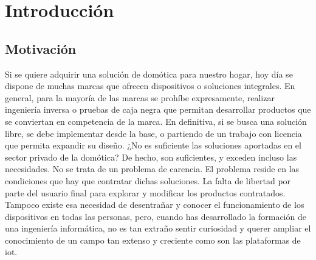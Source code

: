 \cleardoublepage

\chapter{Introducción}

\section{Motivación}
\label{ch:Capitulo1}

Si se quiere adquirir una solución de domótica para nuestro hogar, hoy día se dispone de muchas marcas que ofrecen dispositivos o soluciones integrales. En general, para la mayoría de las marcas se prohíbe expresamente, realizar ingeniería inversa o pruebas de caja negra que permitan desarrollar productos que se conviertan en competencia de la marca. En definitiva, si se busca una solución libre, se debe implementar desde la base, o partiendo de un trabajo con licencia que permita expandir su diseño. ¿No es suficiente las soluciones aportadas en el sector privado de la domótica? De hecho, son suficientes, y exceden incluso las necesidades. No se trata de un problema de carencia. El problema reside en las condiciones que hay que contratar dichas soluciones. La falta de libertad por parte del usuario final para explorar y modificar los productos contratados. Tampoco existe esa necesidad de desentrañar y conocer el funcionamiento de los dispositivos en todas las personas, pero, cuando has desarrollado la formación de una ingeniería informática, no es tan extraño sentir curiosidad y querer ampliar el conocimiento de un campo tan extenso y creciente como son las plataformas de \gls{iot}.

\vspace{1cm}

